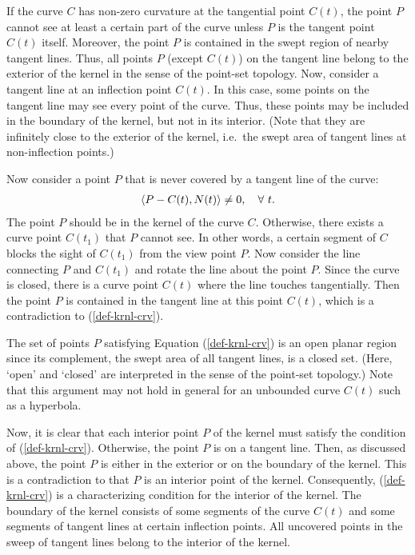 \documentclass{elsart}
\begin{document}
If the curve $C$ has non-zero curvature at the tangential point $C(t)$,
the point $P$ cannot see at least a certain part of the curve
unless $P$ is the tangent point $C(t)$ itself.
%
%
%
Moreover, the point $P$ is contained in the swept region of nearby tangent lines.
Thus, all points $P$ (except $C(t)$) on the tangent line belong to
the exterior of the kernel in the sense of the point-set topology.
Now, consider a tangent line at an inflection point $C(t)$.
In this case, some points on the tangent line may see
every point of the curve.  Thus, these points may be included
in the boundary of the kernel, but not in its interior.
(Note that they are infinitely close to the exterior of the kernel,
i.e.~the swept area of tangent lines at non-inflection points.)

Now consider a point $P$ that is never covered by a tangent line
of the curve:
\begin{eqnarray}
\left<{P - C(t)}, {N(t)} \right> \neq 0,\quad \forall\ t.
\label{def-krnl-crv}
\end{eqnarray}
The point $P$ should be in the kernel of the curve $C$.
Otherwise, there exists a curve point $C(t_1)$ that $P$ cannot see.
In other words, a certain segment of $C$ blocks the sight of $C(t_1)$
from the view point $P$.  Now consider the line connecting $P$ and
$C(t_1)$ and rotate the line about the point $P$.  Since the curve
is closed, there is a curve point $C(t)$ where the line touches
tangentially.  Then the point $P$ is contained in the tangent line
at this point $C(t)$, which is a contradiction to (\ref{def-krnl-crv}).

The set of points $P$ satisfying Equation (\ref{def-krnl-crv}) is
an open planar region since its complement, the swept area of
all tangent lines, is a closed set.  (Here, `open' and `closed'
are interpreted in the sense of the point-set topology.)
Note that this argument may not hold in general
for an unbounded curve $C(t)$ such as a hyperbola.

Now, it is clear that each interior point $P$ of the kernel 
must satisfy the condition of (\ref{def-krnl-crv}).
Otherwise, the point $P$ is on a tangent line.
%
%
%
Then, as discussed above, the point $P$ is either in the exterior
or on the boundary of the kernel.
This is a contradiction to that $P$ is an interior point of the kernel.
Consequently, (\ref{def-krnl-crv}) is a characterizing condition
for the interior of the kernel.  The boundary of the kernel
consists of some segments of the curve $C(t)$ and some segments
of tangent lines at certain inflection points.  All uncovered points
in the sweep of tangent lines belong to the interior of the kernel.
 
\end{document}
